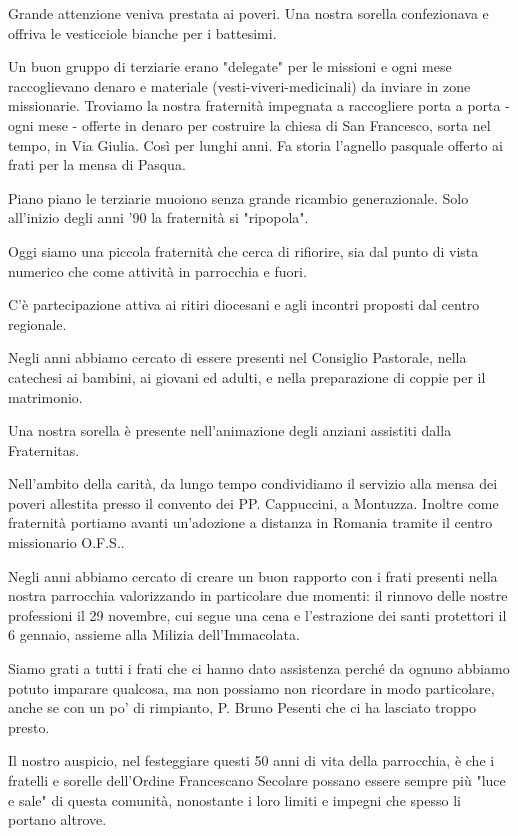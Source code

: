 Grande attenzione veniva prestata ai poveri. Una nostra sorella confezionava e offriva le 
vesticciole bianche per i battesimi. 

Un buon gruppo di terziarie erano "delegate" per le missioni e ogni mese raccoglievano denaro e 
materiale (vesti-viveri-medicinali) da inviare in zone missionarie. Troviamo la nostra fraternità 
impegnata a raccogliere porta a porta - ogni mese - offerte in denaro per costruire la chiesa di San 
Francesco, sorta nel tempo, in Via Giulia. Così per lunghi anni. Fa storia l'agnello pasquale offerto 
ai frati per la mensa di Pasqua. 

Piano piano le terziarie muoiono senza grande ricambio generazionale. Solo all'inizio degli anni '90 
la fraternità si "ripopola". 

Oggi siamo una piccola fraternità che cerca di rifiorire, sia dal punto di vista numerico che come 
attività in parrocchia e fuori. 

C'è partecipazione attiva ai ritiri diocesani e agli incontri proposti dal centro regionale. 

Negli anni abbiamo cercato di essere presenti  nel Consiglio Pastorale, nella catechesi ai bambini, 
ai giovani ed adulti, e nella preparazione di coppie per il matrimonio. 

Una nostra sorella è presente nell'animazione degli anziani assistiti dalla Fraternitas. 

Nell'ambito della carità, da lungo tempo condividiamo il servizio alla mensa dei poveri allestita 
presso il convento dei PP. Cappuccini, a Montuzza. Inoltre come fraternità portiamo avanti 
un'adozione a distanza in Romania tramite il centro missionario O.F.S..

Negli anni abbiamo cercato di creare un buon rapporto con i frati presenti nella nostra parrocchia 
valorizzando in particolare due momenti: il rinnovo delle nostre professioni il 29 novembre, cui 
segue una cena e l'estrazione dei santi protettori il 6 gennaio, assieme alla Milizia dell'Immacolata. 

Siamo grati a tutti i frati che ci hanno dato assistenza perché da ognuno abbiamo potuto imparare 
qualcosa, ma non possiamo non ricordare in modo particolare, anche se con un po' di rimpianto, 
P. Bruno Pesenti che ci ha lasciato troppo presto. 

Il nostro auspicio, nel festeggiare questi 50 anni di vita della parrocchia, è che i fratelli e sorelle 
dell'Ordine Francescano Secolare possano essere sempre più "luce e sale" di questa comunità, 
nonostante i loro limiti e impegni che spesso li portano altrove.

